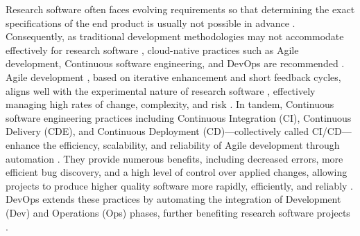 \documentclass{article}
\begin{document}
Research software often faces evolving requirements so that determining the exact specifications of the end product is usually not possible in advance \cite{SoftDevEnvForSciSoft, ProblemsOfEndUserDevs}. Consequently, as traditional development methodologies may not accommodate effectively for research software \cite{DevelopingSciSoft, SoftEngForCompSci, DealingWithRiskInSciSoft, BalancingAgilityAndDiscipline}, cloud-native practices such as Agile development, Continuous software engineering, and DevOps are recommended \cite{AdoptingSoftEngConceptsInSciResearch, LitRevAgileInSciSoftDev, BestPracticesForSciComp}.
Agile development \cite{AgileSoftDev}, based on iterative enhancement and short feedback cycles, aligns well with the experimental nature of research software \cite{WhenEngineersMetScientists, SoftDevEnvForSciSoft, SurveySEPracticesInScience}, effectively managing high rates of change, complexity, and risk \cite{AgileSoftDevMethodAndPractices, AgileSoftDevEcosystems}. In tandem, Continuous software engineering practices including Continuous Integration (CI), Continuous Delivery (CDE), and Continuous Deployment (CD)—collectively called CI/CD—enhance the efficiency, scalability, and reliability of Agile development through automation \cite{ContSoftEngineering, ContinuousSoftEng, CICDSystematicReview}. They provide numerous benefits, including decreased errors, more efficient bug discovery, and a high level of control over applied changes, allowing projects to produce higher quality software more rapidly, efficiently, and reliably \cite{UsageCostsAndBenefitsOfCI, CDatFacebook, EffectsOfCIOnSoftDev, QualityAndProductivityCI, ImpactOfCI, ExpBenefitsOfCI, UncoveringBenefitsAndChallengesOfCI, ModelingCI, ExtremeProgExplained, StairwayToHeaven, CDReliableSoftReleaseBook, CDatFBandOANDA, CDHugeBenefits, StudyImpactAdoptCIOnPR}. DevOps extends these practices by automating the integration of Development (Dev) and Operations (Ops) phases, further benefiting research software projects \cite{WhatIsDevOps, DevOpsInSciSysDev, ResearchOps}.
\end{document}
